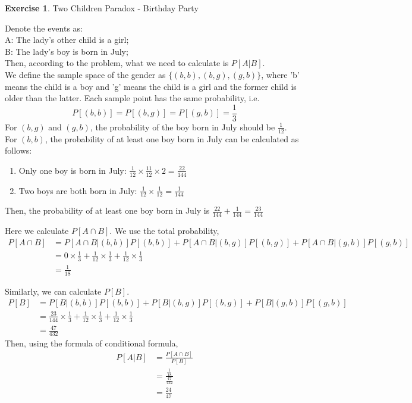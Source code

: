 \documentclass[12pt,a4paper]{article}
\makeatletter
\theoremstyle{definition}
\newtheorem{exercise}{Exercise}
\newtheorem*{solution}{Solution}
\renewenvironment{solution}[1][Solution] {\par\pushQED{\qed}\normalfont\topsep6\p@\@plus6\p@\relax\trivlist\item[\hskip\labelsep\bfseries#1\@addpunct{.}]\ignorespaces}{\popQED\endtrivlist\@endpefalse} \makeatother
\makeatother
\begin{document}
\begin{exercise}
   Two Children Paradox - Birthday Party\\
   \begin{solution}
Denote the events as:\\
A: The lady's other child is a girl;\\
B: The lady's boy is born in July;\\
Then, according to the problem, what we need to calculate is $P[A|B]$.\\
We define the sample space of the gender as $\{(b,b),(b,g),(g,b)\}$, where 'b' means the child is a boy and 'g' means the child is a girl and the former child is older than the latter. Each sample point has the same probability, i.e. $$P[(b,b)]=P[(b,g)]=P[(g,b)]=\frac{1}{3}$$
For $(b,g)$ and $(g,b)$, the probability of the boy born in July should be $\frac{1}{12}$.\\
For $(b,b)$, the probability of at least one boy born in July can be calculated as follows:
\begin{enumerate}[label=\roman*)]
    \item Only one boy is born in July: $\frac{1}{12}\times\frac{11}{12}\times 2=\frac{22}{144}$
    \item Two boys are both born in July: $\frac{1}{12}\times\frac{1}{12}=\frac{1}{144}$
\end{enumerate}
Then, the probability of at least one boy born in July is $\frac{22}{144}+\frac{1}{144}=\frac{23}{144}$

Here we calculate $P[A\cap B]$. We use the total probability,
\begin{equation*}
    \begin{split}
    P[A\cap B]&=P[A\cap B|(b,b)]P[(b,b)]+P[A\cap B|(b,g)]P[(b,g)]+P[A\cap B|(g,b)]P[(g,b)]\\
    &=0\times \frac{1}{3}+\frac{1}{12}\times \frac{1}{3}+\frac{1}{12}\times\frac{1}{3}\\
    &=\frac{1}{18}
    \end{split}
\end{equation*}

Similarly, we can calculate $P[B]$.
\begin{equation*}
\begin{split}
    P[B]&=P[B|(b,b)]P[(b,b)]+P[B|(b,g)]P[(b,g)]+P[B|(g,b)]P[(g,b)]\\
    &=\frac{23}{144}\times \frac{1}{3}+\frac{1}{12}\times\frac{1}{3}+\frac{1}{12}\times\frac{1}{3}\\
    &=\frac{47}{432}
\end{split}
\end{equation*}
Then, using the formula of conditional formula,
\begin{align*}
    P[A|B]&=\frac{P[A\cap B]}{P[B]}\\
    &=\frac{\frac{1}{18}}{\frac{47}{432}}\\
    &=\frac{24}{47}
\end{align*}
\end{solution}
\end{exercise}
\end{document}
